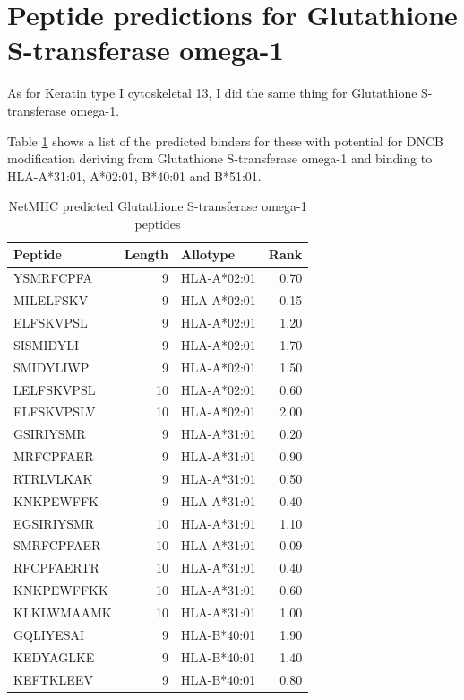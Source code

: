\documentclass[12pt,]{book}
\begin{document}
\section{Peptide predictions for Glutathione S-transferase
omega-1}\label{peptide-predictions-for-glutathione-s-transferase-omega-1}

As for Keratin type I cytoskeletal 13, I did the same thing for
Glutathione S-transferase omega-1.

Table \ref{tab:gst-peps} shows a list of the predicted binders for these
with potential for DNCB modification deriving from Glutathione
S-transferase omega-1 and binding to HLA-A*31:01, A*02:01, B*40:01 and
B*51:01.

\begin{table}

\caption{\label{tab:gst-peps}NetMHC predicted Glutathione S-transferase omega-1 peptides}
\centering
\begin{tabular}[t]{lrlr}
\toprule
Peptide & Length & Allotype & Rank\\
\midrule
YSMRFCPFA & 9 & HLA-A*02:01 & 0.70\\
MILELFSKV & 9 & HLA-A*02:01 & 0.15\\
ELFSKVPSL & 9 & HLA-A*02:01 & 1.20\\
SISMIDYLI & 9 & HLA-A*02:01 & 1.70\\
SMIDYLIWP & 9 & HLA-A*02:01 & 1.50\\
\addlinespace
LELFSKVPSL & 10 & HLA-A*02:01 & 0.60\\
ELFSKVPSLV & 10 & HLA-A*02:01 & 2.00\\
GSIRIYSMR & 9 & HLA-A*31:01 & 0.20\\
MRFCPFAER & 9 & HLA-A*31:01 & 0.90\\
RTRLVLKAK & 9 & HLA-A*31:01 & 0.50\\
\addlinespace
KNKPEWFFK & 9 & HLA-A*31:01 & 0.40\\
EGSIRIYSMR & 10 & HLA-A*31:01 & 1.10\\
SMRFCPFAER & 10 & HLA-A*31:01 & 0.09\\
RFCPFAERTR & 10 & HLA-A*31:01 & 0.40\\
KNKPEWFFKK & 10 & HLA-A*31:01 & 0.60\\
\addlinespace
KLKLWMAAMK & 10 & HLA-A*31:01 & 1.00\\
GQLIYESAI & 9 & HLA-B*40:01 & 1.90\\
KEDYAGLKE & 9 & HLA-B*40:01 & 1.40\\
KEFTKLEEV & 9 & HLA-B*40:01 & 0.80\\

\end{tabular}
\end{table}
\end{document}
